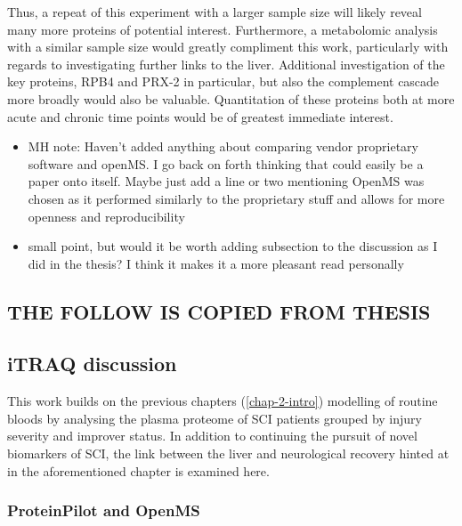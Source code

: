 \documentclass[9pt,lineno]{elife}
\providecommand{\tightlist}{%
  \setlength{\itemsep}{0pt}\setlength{\parskip}{0pt}}
\begin{document}
\begin{landscape}
\begin{landscape}
Thus, a repeat of this experiment with a larger sample size will likely reveal many more proteins of potential interest.
Furthermore, a metabolomic analysis with a similar sample size would greatly compliment this work, particularly with regards to investigating further links to the liver.
Additional investigation of the key proteins, RPB4 and PRX-2 in particular, but also the complement cascade more broadly would also be valuable.
Quantitation of these proteins both at more acute and chronic time points would be of greatest immediate interest.

\begin{itemize}
\tightlist
\item
  MH note: Haven't added anything about comparing vendor proprietary software and openMS. I go back on forth thinking that could easily be a paper onto itself. Maybe just add a line or two mentioning OpenMS was chosen as it performed similarly to the proprietary stuff and allows for more openness and reproducibility
\item
  small point, but would it be worth adding subsection to the discussion as I did in the thesis? I think it makes it a more pleasant read personally
\end{itemize}

\hypertarget{the-follow-is-copied-from-thesis}{%
\subsection{THE FOLLOW IS COPIED FROM THESIS}\label{the-follow-is-copied-from-thesis}}

\hypertarget{itraq-discussion}{%
\subsection{iTRAQ discussion}\label{itraq-discussion}}

This work builds on the previous chapters (\ref{chap-2-intro}) modelling of routine bloods by analysing the plasma proteome of SCI patients grouped by injury severity and improver status.
In addition to continuing the pursuit of novel biomarkers of SCI, the link between the liver and neurological recovery hinted at in the aforementioned chapter is examined here.

\hypertarget{proteinpilot-and-openms}{%
\subsubsection{ProteinPilot and OpenMS}\label{proteinpilot-and-openms}}


\end{landscape}
\end{landscape}
\end{document}
